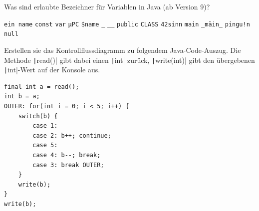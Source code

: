 \documentclass[11pt]{exam} %
\newcommand{\code}[1]{\texttt|#1|}
\newcommand{\fillinline}[1]{\ifprintanswers\fillin[\code{#1}][3cm]\fi\xrfill[-1pt]{0.2mm}}
\begin{document}
\begin{questions}
\filbreak
\question Was sind erlaubte Bezeichner für Variablen in Java (ab Version 9)?
\begin{checkboxes}
\choice \texttt{ein name}
\CorrectChoice \texttt{const}
\CorrectChoice \texttt{var}
\CorrectChoice \texttt{µPC}
\CorrectChoice \texttt{\$name}
\choice \texttt{\_}
\CorrectChoice \texttt{\_\_}
\choice \texttt{public}
\CorrectChoice \texttt{CLASS}
\choice \texttt{42sinn}
\CorrectChoice \texttt{main}
\CorrectChoice \texttt{\_mäin\_}
\choice \texttt{pingu!n}
\choice \texttt{null}
\end{checkboxes}
\filbreak
\question Erstellen sie das Kontrollflussdiagramm zu folgendem Java-Code-Auszug. Die Methode \code{read()} gibt dabei einen \code{int} zurück, \code{write(int)} gibt den übergebenen \code{int}-Wert auf der Konsole aus.
\begin{verbatim}
final int a = read();
int b = a;
OUTER: for(int i = 0; i < 5; i++) {
	switch(b) {
		case 1:
		case 2: b++; continue;
		case 5:
		case 4: b--; break;
		case 3: break OUTER;
	}
	write(b);
}
write(b);
\end{verbatim}
\begin{solution}\par\nobreak

\end{solution}
\end{questions}
\end{document}
